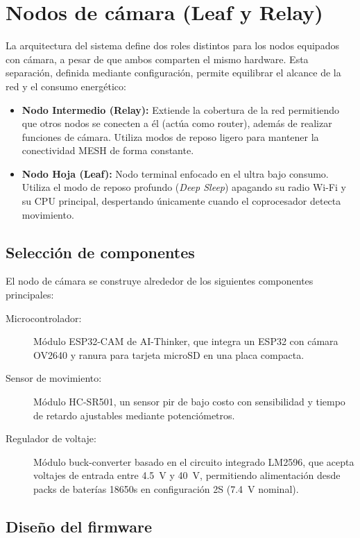\documentclass[a4paper, 12pt]{report}
\begin{document}
\section{Nodos de cámara (Leaf y Relay)}

La arquitectura del sistema define dos roles distintos para los nodos equipados con cámara, a pesar de que ambos comparten el mismo hardware. Esta separación, definida mediante configuración, permite equilibrar el alcance de la red y el consumo energético:

\begin{itemize}
  \item \textbf{Nodo Intermedio (Relay):} Extiende la cobertura de la red permitiendo que otros nodos se conecten a él (actúa como router), además de realizar funciones de cámara. Utiliza modos de reposo ligero para mantener la conectividad MESH de forma constante.
  \item \textbf{Nodo Hoja (Leaf):} Nodo terminal enfocado en el ultra bajo consumo. Utiliza el modo de reposo profundo (\textit{Deep Sleep}) apagando su radio Wi-Fi y su CPU principal, despertando únicamente cuando el coprocesador detecta movimiento.
\end{itemize}

\subsection{Selección de componentes}

El nodo de cámara se construye alrededor de los siguientes componentes
principales:

\begin{description}
  \item[Microcontrolador:] Módulo ESP32-CAM de AI-Thinker, que integra un
    \gls{ESP32} con cámara OV2640 y ranura para tarjeta microSD en una
    placa compacta.
  \item[Sensor de movimiento:] Módulo HC-SR501, un sensor \gls{pir} de bajo
    costo con sensibilidad y tiempo de retardo ajustables mediante
    potenciómetros.
  \item[Regulador de voltaje:] Módulo \gls{buck-converter} basado en el
    circuito integrado LM2596, que acepta voltajes de entrada entre
    \qty{4.5}{V} y \qty{40}{V}, permitiendo alimentación desde packs de baterías
    \glspl{18650} en configuración 2S (\qty{7.4}{V} nominal).
\end{description}

\subsection{Diseño del firmware}
\end{document}
